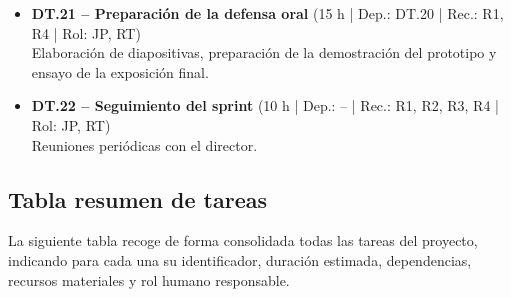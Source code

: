 \documentclass{article}
\begin{document}
{\begin{itemize}[leftmargin=*, itemsep=2pt]
\begin{itemize}[leftmargin=1.2em, itemsep=2pt]
                    \item \textbf{DT.21 – Preparación de la defensa oral} 
                    (15 h | Dep.: DT.20 | Rec.: R1, R4 | Rol: JP, RT) \\
                    Elaboración de diapositivas, preparación de la demostración del 
                    prototipo y ensayo de la exposición final.

                    \item \textbf{DT.22 – Seguimiento del sprint} 
                    (10 h | Dep.: -- | Rec.: R1, R2, R3, R4 | Rol: JP, RT) \\
                    Reuniones periódicas con el director.
                
                \end{itemize}

        \end{itemize}

    \subsection{Tabla resumen de tareas}

    \justify
    La siguiente tabla recoge de forma consolidada todas las tareas del proyecto, 
    indicando para cada una su identificador, duración estimada, dependencias, 
    recursos materiales y rol humano responsable.

}
\end{document}
